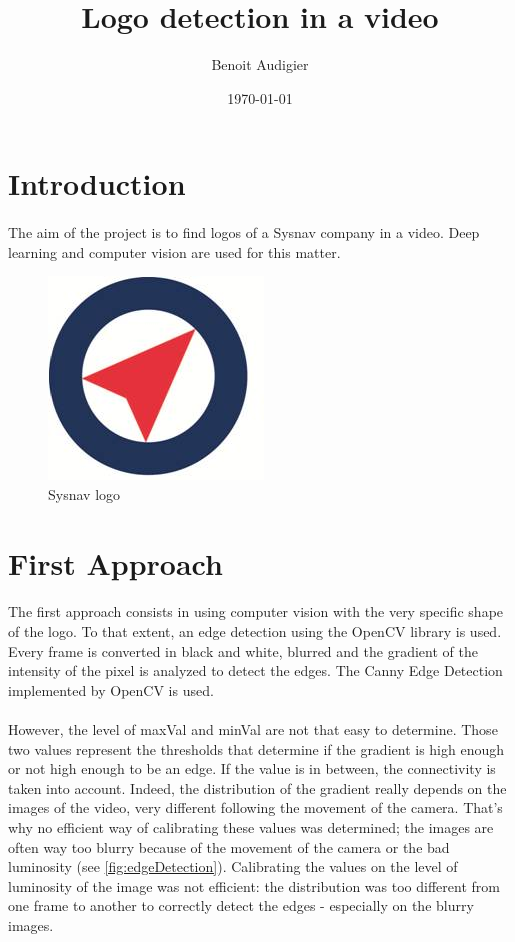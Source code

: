 \documentclass[12pt]{article}%
\begin{document}
\title{Logo detection in a video}
\author{Benoit Audigier}
\date{\today}



\maketitle
\section{Introduction}

\paragraph{}
The aim of the project is to find logos of a Sysnav company in a video. Deep learning and computer vision are used for this matter.

\begin{figure}[H]
\centering
\includegraphics[width=.2\textwidth]{images/logo.png}
\caption{\label{fig:logo}Sysnav logo}
\end{figure}




\section{First Approach}

\paragraph{}
The first approach consists in using computer vision with the very specific shape of the logo. To that extent, an edge detection using the OpenCV library is used. Every frame is converted in black and white, blurred and the gradient of the intensity of the pixel is analyzed to detect the edges. The Canny Edge Detection \cite{canny} implemented by OpenCV is used. 

\paragraph{}
However, the level of maxVal and minVal are not that easy to determine.  Those two values represent the thresholds that determine if the gradient is high enough or not high enough to be an edge. If the value is in between, the connectivity is taken into account. Indeed, the distribution of the gradient really depends on the images of the video, very different following the movement of the camera. That's why no efficient way of calibrating these values was determined; the images are often way too blurry because of the movement of the camera or the bad luminosity (see \ref{fig:edgeDetection}). Calibrating the values on the level of luminosity of the image was not efficient: the distribution was too different from one frame to another to correctly detect the edges - especially on the blurry images.
\end{document}
